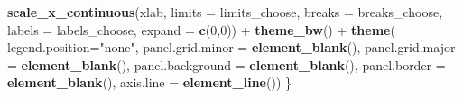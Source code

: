 \documentclass[11pt,,]{article}
\newenvironment{Shaded}{\begin{snugshade}}{\end{snugshade}}
\newcommand{\KeywordTok}[1]{\textcolor[rgb]{0.13,0.29,0.53}{\textbf{{#1}}}}
\newcommand{\DataTypeTok}[1]{\textcolor[rgb]{0.13,0.29,0.53}{{#1}}}
\newcommand{\DecValTok}[1]{\textcolor[rgb]{0.00,0.00,0.81}{{#1}}}
\newcommand{\StringTok}[1]{\textcolor[rgb]{0.31,0.60,0.02}{{#1}}}
\newcommand{\NormalTok}[1]{{#1}}
\begin{document}
\begin{Shaded}
\begin{Highlighting}[]
\StringTok{      }\KeywordTok{scale_x_continuous}\NormalTok{(xlab, }
        \DataTypeTok{limits =} \NormalTok{limits_choose,}
        \DataTypeTok{breaks =} \NormalTok{breaks_choose,}
        \DataTypeTok{labels =} \NormalTok{labels_choose,}
        \DataTypeTok{expand =} \KeywordTok{c}\NormalTok{(}\DecValTok{0}\NormalTok{,}\DecValTok{0}\NormalTok{)) +}
\StringTok{      }\KeywordTok{theme_bw}\NormalTok{() +}\StringTok{ }
\StringTok{      }\KeywordTok{theme}\NormalTok{(}
        \DataTypeTok{legend.position=}\StringTok{"none"}\NormalTok{,}
      \DataTypeTok{panel.grid.minor =} \KeywordTok{element_blank}\NormalTok{(), }
        \DataTypeTok{panel.grid.major =} \KeywordTok{element_blank}\NormalTok{(), }
        \DataTypeTok{panel.background =} \KeywordTok{element_blank}\NormalTok{(),}
      \DataTypeTok{panel.border =} \KeywordTok{element_blank}\NormalTok{(), }
        \DataTypeTok{axis.line =} \KeywordTok{element_line}\NormalTok{())}
\NormalTok{\}}
\end{Highlighting}
\end{Shaded}

\newpage
\end{document}
